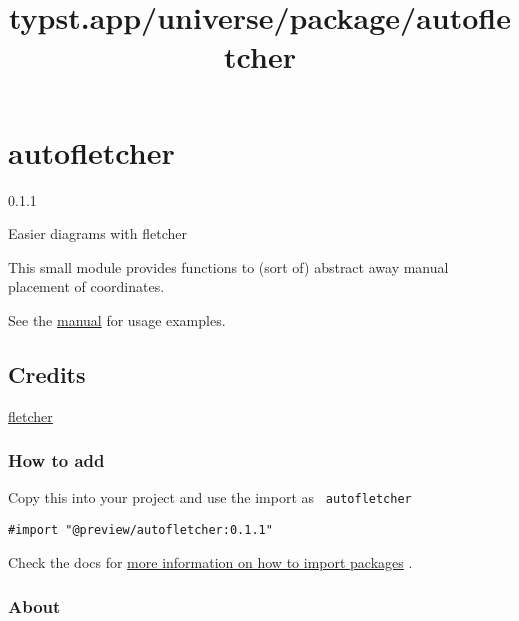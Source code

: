 \title{typst.app/universe/package/autofletcher}

\label{banner}
\section{autofletcher}\label{autofletcher}

{ 0.1.1 }

Easier diagrams with fletcher

\label{readme}
This small module provides functions to (sort of) abstract away manual
placement of coordinates.

See the
\href{https://raw.githubusercontent.com/3akev/autofletcher/main/manual.pdf}{manual}
for usage examples.

\subsection{Credits}\label{credits}

\href{https://github.com/Jollywatt/typst-fletcher}{fletcher}

\subsubsection{How to add}\label{how-to-add}

Copy this into your project and use the import as
\texttt{\ autofletcher\ }

\begin{verbatim}
#import "@preview/autofletcher:0.1.1"
\end{verbatim}



Check the docs for
\href{https://typst.app/docs/reference/scripting/\#packages}{more
information on how to import packages} .

\subsubsection{About}\label{about}

